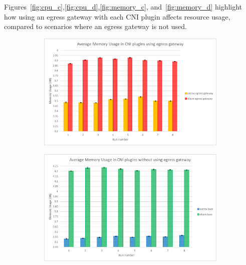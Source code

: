 Figures~\ref{fig:cpu_c},\ref{fig:cpu_d},\ref{fig:memory_c}, and~\ref{fig:memory_d} highlight how using an egress gateway with each CNI plugin affects resource usage, compared to scenarios where an egress gateway is not used.
\begin{figure}[H]
    \centering
    \begin{subfigure}[b]{0.35\textwidth}
        \includegraphics[width=\textwidth]{plots/small/memory_egress.png}
        \caption{}
        \label{fig:memory_a}
    \end{subfigure}
    \hfill
    \begin{subfigure}[b]{0.35\textwidth}
        \includegraphics[width=\textwidth]{plots/small/memory_base.png}
        \caption{}
        \label{fig:memory_b}
    \end{subfigure}
    
    \vspace{10pt}
    

\end{figure}
